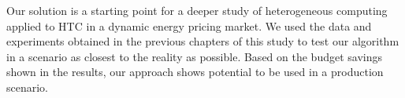 Our solution is a starting point for a deeper study of heterogeneous computing applied to HTC in a dynamic energy pricing market. We used the data and experiments obtained in the previous chapters of this study to test our algorithm in a scenario as closest to the reality as possible. Based on the budget savings shown in the results, our approach shows potential to be used in a production scenario.